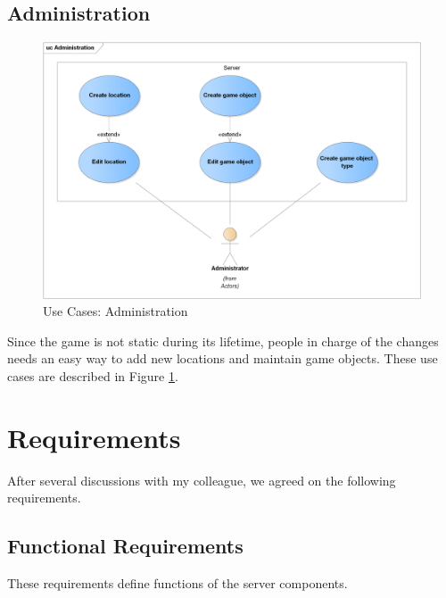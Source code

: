 	\subsection{Administration}
	\begin{figure}[h]	
		\includegraphics[width=\textwidth]{figures/UC_Administration}
		\centering			
		\caption{Use Cases: Administration}
		\label{fig:ucadmin}				
	\end{figure}	
	\noindent Since the game is not static during its lifetime, people in charge of the changes needs an easy way to add new locations and maintain game objects. These use cases are described in Figure \ref{fig:ucadmin}.
	
	
\section{Requirements}
\label{section:requirements}
After several discussions with my colleague, we agreed on the following requirements.

	\subsection{Functional Requirements}
	\label{section:fr}
	These requirements define functions of the server components.
